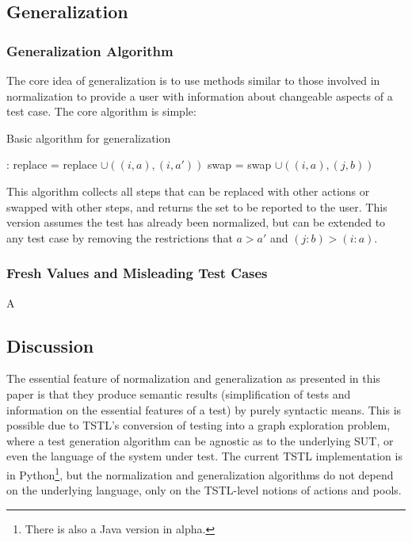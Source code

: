 \subsection{Generalization}

\subsubsection{Generalization Algorithm}

The core idea of generalization is to use methods similar to those
involved in normalization to provide a user with information about
changeable aspects of a test case.  The core algorithm is simple:

\begin{algorithm}
\caption{Basic algorithm for generalization}
\label{genalg}
\begin{algorithmic}[1]
:
\State replace = replace $\cup ((i,a),(i,a'))$
\EndIf
\EndFor 
{}
\State swap = swap $\cup ((i,a),(j,b))$
\EndIf
\EndFor
\EndFor
{}
\end{algorithmic}
\end{algorithm}

This algorithm collects all steps that can be replaced with other
actions or swapped with other steps, and returns the set to be
reported to the user.  This version assumes the test has already been
normalized, but can be extended to any test case by removing the
restrictions that $a > a'$ and $(j : b) > (i : a)$.

\subsubsection{Fresh Values and Misleading Test Cases}

A 

\subsection{Discussion}

The essential feature of normalization and generalization as presented
in this paper is that they produce semantic results (simplification of
tests and information on the essential features of a test) by purely
syntactic means.  This is possible due to TSTL's conversion of testing
into a graph exploration problem, where a test generation algorithm
can be agnostic as to the underlying SUT, or even the language of the
system under test.  The current TSTL implementation is in
Python\footnote{There is also a Java version in alpha.}, but the
normalization and generalization algorithms do not depend on the
underlying language, only on the TSTL-level notions of actions and pools.